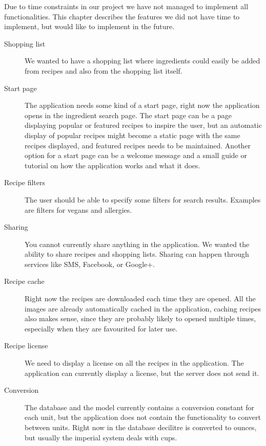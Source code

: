Due to time constraints in our project we have not managed to implement all functionalities. This chapter describes the features we did not have time to implement, but would like to implement in the future.

\begin{description}
\item[Shopping list] We wanted to have a shopping list where ingredients could easily be added from recipes and also from the shopping list itself.

\item[Start page] The application needs some kind of a start page, right now the application opens in the ingredient search page. The start page can be a page displaying popular or featured recipes to inspire the user, but an automatic display of popular recipes might become a static page with the same recipes displayed, and featured recipes needs to be maintained. Another option for a start page can be a welcome message and a small guide or tutorial on how the application works and what it does.

\item[Recipe filters] The user should be able to specify some filters for search results. Examples are filters for vegans and allergies.

\item[Sharing] You cannot currently share anything in the application. We wanted the ability to share recipes and shopping lists. Sharing can happen through services like SMS, Facebook, or Google+.

\item[Recipe cache] Right now the recipes are downloaded each time they are opened. All the images are already automatically cached in the application, caching recipes also makes sense, since they are probably likely to opened multiple times, especially when they are favourited for later use.

\item[Recipe license] We need to display a license on all the recipes in the application. The application can currently display a license, but the server does not send it.

\item[Conversion] The database and the model currently contains a conversion constant for each unit, but the application does not contain the functionality to convert between units. Right now in the database decilitre is converted to ounces, but usually the imperial system deals with cups.


\end{description}
